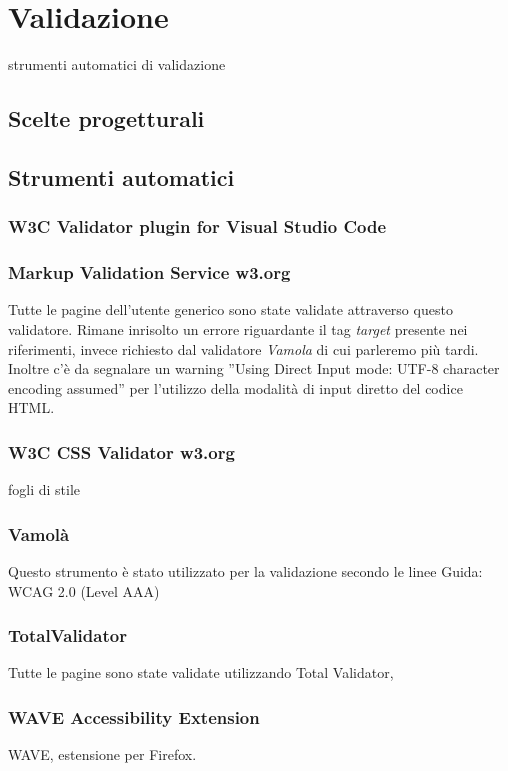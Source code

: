 \newpage
\section{Validazione}
strumenti automatici di validazione 

\subsection{Scelte progetturali}

\subsection{Strumenti automatici}
\subsubsection{W3C Validator plugin for Visual Studio Code}

\subsubsection{Markup Validation Service w3.org}
Tutte le pagine dell'utente generico sono state validate attraverso questo validatore. Rimane inrisolto un errore riguardante il tag \emph{target} presente nei riferimenti, invece richiesto dal validatore \emph{Vamola} di cui parleremo più tardi. Inoltre c'è da segnalare un warning ”Using Direct Input mode: UTF-8 character encoding assumed” per l’utilizzo della modalità di input diretto del codice HTML.
\subsubsection{W3C CSS Validator w3.org}
fogli di stile 
\subsubsection{Vamolà}
Questo strumento è stato utilizzato per la validazione secondo le linee Guida: WCAG 2.0 (Level AAA)
\subsubsection{TotalValidator}
Tutte le pagine sono state validate utilizzando Total Validator, 
\subsubsection{WAVE Accessibility Extension}
 WAVE, estensione per Firefox.\\

